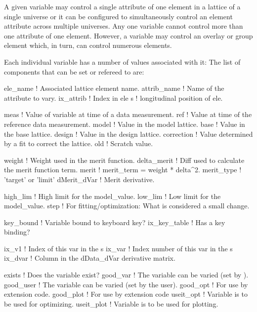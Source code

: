 A given variable may control a single attribute of one element in a
 lattice of a single universe or it can be configured to
simultaneously control an element attribute across multiple
universes. Any one variable cannot control more than one attribute of
one element. However, a variable may control an overlay or group
element which, in turn, can control numerous elements.

Each individual variable has a number of values associated with it:
The list of components that can be set or refereed to are:
\begin{example}
  ele_name     ! Associated lattice element name.
  attrib_name  ! Name of the attribute to vary.
  ix_attrib    ! Index in ele%
  s            ! longitudinal position of ele.

  meas         ! Value of variable at time of a data measurement.
  ref          ! Value at time of the reference data measurement.
  model        ! Value in the model lattice.
  base         ! Value in the base lattice.
  design       ! Value in  the design lattice.
  correction   ! Value determined by a fit to correct the lattice.
  old          ! Scratch value.

  weight       ! Weight used in the merit function.
  delta_merit  ! Diff used to calculate the merit function term.
  merit        ! merit_term = weight * delta^2.
  merit_type   ! 'target' or 'limit'
  dMerit_dVar  ! Merit derivative.

  high_lim     ! High limit for the model_value.
  low_lim      ! Low limit for the model_value.
  step         ! For fitting/optimization: What is considered a small change.

  key_bound    ! Variable bound to keyboard key?
  ix_key_table ! Has a key binding?

  ix_v1        ! Index of this var in the s%
  ix_var       ! Index number of this var in the s%
  ix_dvar      ! Column in the dData_dVar derivative matrix.

  exists       ! Does the variable exist?
  good_var     ! The variable can be varied (set by \tao).
  good_user    ! The variable can be varied (set by the user).
  good_opt     ! For use by extension code.
  good_plot    ! For use by extension code
  useit_opt    ! Variable is to be used for optimizing.
  useit_plot   ! Variable is to be used for plotting.
\end{example}


